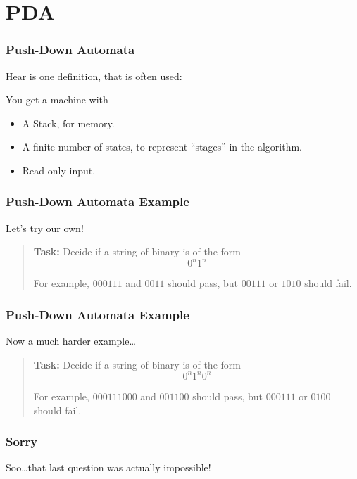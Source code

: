 \documentclass[mathserif]{beamer}
\begin{document}
\section{PDA}
\begin{frame}
  \frametitle{Push-Down Automata}

  Hear is one definition, that is often used:

  You get a machine with
  \begin{itemize}
    \item A Stack, for memory.
    \item A finite number of states, to represent ``stages'' in the algorithm.
    \item Read-only input.
  \end{itemize}
\end{frame}

\begin{frame}
  \frametitle{Push-Down Automata Example}
  Let's try our own!

  \begin{quote}
    \textbf{Task:} Decide if a string of binary is of the form
    \[0^n1^n\]

    For example, $000111$ and $0011$ should pass, but $00111$ or $1010$ should
    fail.
  \end{quote}
\end{frame}

\begin{frame}
  \frametitle{Push-Down Automata Example}
  Now a much harder example\ldots

  \begin{quote}
    \textbf{Task:} Decide if a string of binary is of the form
    \[0^n1^n0^n\]

    For example, $000111000$ and $001100$ should pass, but $000111$ or $0100$
    should fail.
  \end{quote}
\end{frame}

\begin{frame}
  \frametitle{Sorry}

  \centerline{Soo\ldots that last question was actually impossible!}
\end{frame}

\end{document}
